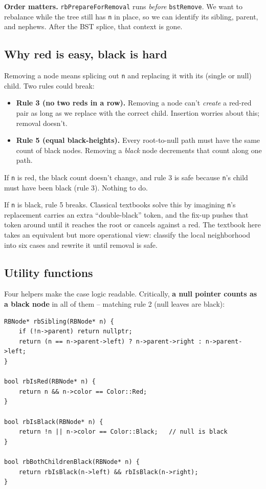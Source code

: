 \documentclass[11pt]{article}
\begin{document}
\begin{warnbox}
\textbf{Order matters.} \texttt{rbPrepareForRemoval} runs \emph{before} \texttt{bstRemove}. We want to rebalance while the tree still has \texttt{n} in place, so we can identify its sibling, parent, and nephews. After the BST splice, that context is gone.
\end{warnbox}

\subsection*{Why red is easy, black is hard}

Removing a node means splicing out \texttt{n} and replacing it with its (single or null) child. Two rules could break:

\begin{itemize}[leftmargin=*]
    \item \textbf{Rule 3 (no two reds in a row).} Removing a node can't \emph{create} a red-red pair as long as we replace with the correct child. Insertion worries about this; removal doesn't.
    \item \textbf{Rule 5 (equal black-heights).} Every root-to-null path must have the same count of black nodes. Removing a \emph{black} node decrements that count along one path.
\end{itemize}

If \texttt{n} is red, the black count doesn't change, and rule 3 is safe because \texttt{n}'s child must have been black (rule 3). Nothing to do.

If \texttt{n} is black, rule 5 breaks. Classical textbooks solve this by imagining \texttt{n}'s replacement carries an extra ``double-black'' token, and the fix-up pushes that token around until it reaches the root or cancels against a red. The textbook here takes an equivalent but more operational view: classify the local neighborhood into six cases and rewrite it until removal is safe.

\subsection*{Utility functions}

Four helpers make the case logic readable. Critically, \textbf{a null pointer counts as a black node} in all of them -- matching rule 2 (null leaves are black):

\begin{lstlisting}[basicstyle=\ttfamily\small,frame=single]
RBNode* rbSibling(RBNode* n) {
    if (!n->parent) return nullptr;
    return (n == n->parent->left) ? n->parent->right : n->parent->left;
}

bool rbIsRed(RBNode* n) {
    return n && n->color == Color::Red;
}

bool rbIsBlack(RBNode* n) {
    return !n || n->color == Color::Black;   // null is black
}

bool rbBothChildrenBlack(RBNode* n) {
    return rbIsBlack(n->left) && rbIsBlack(n->right);
}
\end{lstlisting}
\end{document}
